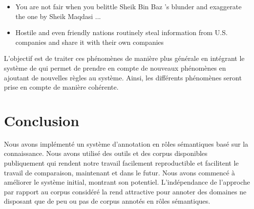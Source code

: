 \begin{itemize}
    \item You are not fair when you belittle Sheik Bin Baz 's blunder and
          exaggerate the one by Sheik Maqdasi ...
    \item Hostile and even friendly nations routinely steal information from
          U.S. companies and share it with their own companies
\end{itemize}

L'objectif est de traiter ces phénomènes de manière plus générale en intégrant
le système de \cite{ribeyre2013systeme} qui permet de prendre en compte de
nouveaux phénomènes en ajoutant de nouvelles règles au système. Ainsi, les
différents phénomènes seront prise en compte de manière cohérente.

\section{Conclusion}

Nous avons implémenté un système d'annotation en rôles sémantiques basé sur la
connaissance. Nous avons utilisé des outils et des corpus disponibles
publiquement qui rendent notre travail facilement reproductible et facilitent
le travail de comparaison, maintenant et dans le futur. Nous avons commencé à
améliorer le système initial, montrant son potentiel. L'indépendance de
l'approche par rapport au corpus considéré la rend attractive pour annoter des
domaines ne disposant que de peu ou pas de corpus annotés en rôles sémantiques.
